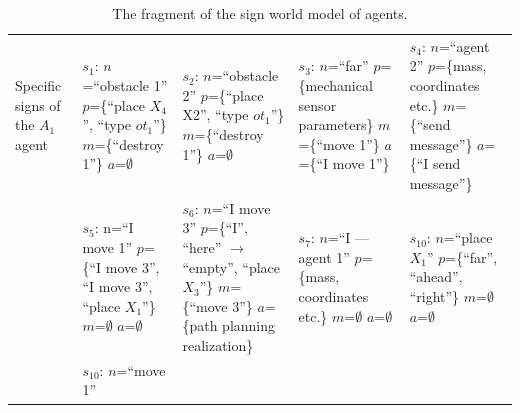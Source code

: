 \documentclass[runningheads,a4paper]{llncs}
\begin{document}
\setlength{\tabcolsep}{5pt}
\renewcommand{\arraystretch}{1.5}
\begin{table}\tiny
	\caption{The fragment of the sign world model of agents.}	
	\label{tab:world}
	\begin{tabular}{| p{1.5cm} | p{2.2cm} | p{2.2cm} | p{2.2cm} | p{2.2cm} |}
		\hline
		Specific signs of the $A_1$ agent
		&
		$s_1$: $n$=``obstacle 1''\newline
		$p$=\{``place $X_4$'', ``type $ot_1$''\}\newline
		$m$=\{``destroy 1''\}\newline
		$a$=$\emptyset$
		&
		$s_2$: $n$=``obstacle 2''\newline
		$p$=\{``place X2'', ``type $ot_1$''\}\newline
		$m$=\{``destroy 1''\}\newline
		$a$=$\emptyset$
		&
		$s_3$: $n$=``far''\newline
		$p$=\{mechanical sensor parameters\}\newline
		$m$=\{``move 1''\}\newline
		$a$=\{``I move 1''\}
		&
		$s_4$: $n$=``agent 2''\newline
		$p$=\{mass, coordinates etc.\}\newline
		$m$=\{``send message''\}\newline
		$a$=\{``I send message''\}
		\\\cline{2-5}
		&
		$s_5$: n=``I move 1''\newline
		$p$=\{``I move 3'', ``I move 3'', ``place $X_1$''\}\newline
		$m$=$\emptyset$\newline
		$a$=$\emptyset$	
		&
		$s_6$: $n$=``I move 3''\newline
		$p$=\{``I'', ``here'' $\rightarrow$ ``empty'', ``place $X_3$''\}\newline
		$m$=\{``move 3''\}\newline
		$a$=\{path planning realization\}
		&
		$s_7$: $n$=``I --- agent 1''\newline
		$p$=\{mass, coordinates etc.\}\newline
		$m$=$\emptyset$\newline
		$a$=$\emptyset$	
		&
		$s_{10}$: $n$=``place $X_1$''\newline
		$p$=\{``far'', ``ahead'', ``right''\}\newline
		$m$=$\emptyset$\newline
		$a$=$\emptyset$
		\\ \hline
		&
		$s_{10}$: $n$=``move 1''\newline

\end{tabular}
\end{table}
\end{document}
